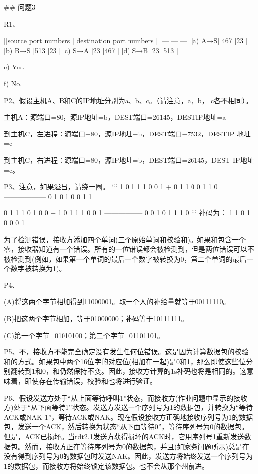 \documentclass[11pt,UTF8,twoside]{article}
\begin{document}
	\newpage
\pagestyle{fancy}
\fancyhf{}  %
\pagestyle{fancy}
	
	## 问题3 
	
	R1、
	
	||source port numbers | destination port numbers | 
	|---|---|---|
	|a) A→S| 467 |23 |
	|b) B→S |513 |23 |
	|c) S→A |23 |467 |
	|d) S→B |23| 513 |
	
	e) Yes. 
	
	f) No. 
	
	P2、假设主机A、B和C的IP地址分别为a、b、c。（请注意，a，b， c各不相同）。
	
	主机A：源端口=80，源IP地址=b，DEST端口=26145，DESTIP地址=a 
	
	到主机C，左进程：源端口=80，源IP地址=b，DEST端口=7532，DESTIP 地址=c 
	
	到主机C，右进程：源端口=80，源IP地址=b，DEST端口=26145，DEST IP地址=c。
	
	P3、注意，如果溢出，请绕一圈。
	```
	1 0 1 1 1 0 0 1
	+ 0 1 1 0 0 1 1 0
	------------------
	0 1 0 1 0 0 1 1
	
	
	0 1 1 1 0 1 0 0
	+ 1 0 1 1 1 0 0 1
	-----------------
	0 0 1 0 1 1 1 0
	```
	补码为： 1 1 0 1 0 0 0 1
	
	为了检测错误，接收方添加四个单词(三个原始单词和校验和)。如果和包含一个零，接收器知道有一个错误。所有的一位错误都会被检测到，但是两位错误可以不被检测到(例如，如果第一个单词的最后一个数字被转换为0，第二个单词的最后一个数字被转换为1)。
	
	P4、
	
	(A)将这两个字节相加得到11000001。取一个人的补给量就等于00111110。
	
	(B)把这两个字节相加，等于01000000；补码等于10111111。
	
	(C)第一个字节=01010100；第二个字节=01101101。
	
	P5、不，接收方不能完全确定没有发生任何位错误。这是因为计算数据包的校验和的方式。如果包中两个16位字的对应位(相加在一起)是0和1，那么即使这些位分别翻转到1和0，和仍然保持不变。因此，接收方计算的1s补码也将是相同的。这意味着，即使存在传输错误，校验和也将进行验证。
	
	P6、假设发送方处于“从上面等待呼叫1”状态，而接收方(作业问题中显示的接收方)处于“从下面等待1”状态。发送方发送一个序列号为1的数据包，并转换为“等待ACK或NAK 1”，等待ACK或NAK。现在假设接收方正确地接收序列号为1的数据包，发送一个ACK，然后转换为状态“从下面等待0”，等待序列号为0的数据包。但是，ACK已损坏。当rdt2.1发送方获得损坏的ACK时，它用序列号1重新发送数据包。然而，接收方正在等待序列号为0的数据包，并且(如家务问题所示)总是在没有得到序列号为0的数据包时发送NAK。因此，发送方将始终发送一个序列号为1的数据包，而接收方将始终锁定该数据包。也不会从那个州前进。
	
\end{document}
